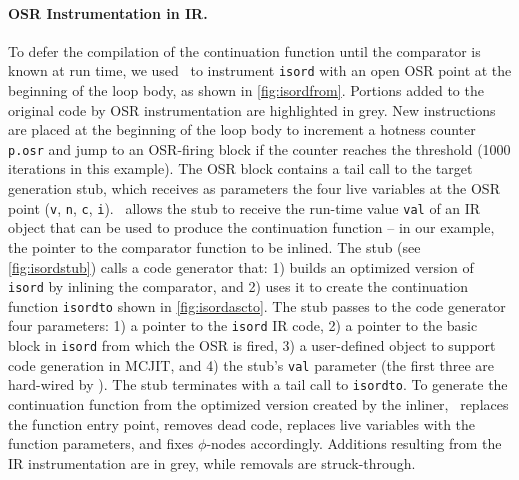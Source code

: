 \paragraph{OSR Instrumentation in IR.}
To defer the compilation of the continuation function until the comparator is known at run time, we used \osrkit\ to instrument {\tt isord} with an open OSR point at the beginning of the loop body, as shown in \myfigure\ref{fig:isordfrom}. Portions added to the original code by OSR instrumentation are highlighted in grey.
New instructions are placed at the beginning of the loop body to increment a hotness counter {\tt p.osr} and jump to an OSR-firing block if the counter reaches the threshold (1000 iterations in this example). The OSR block contains a tail call to the target generation stub, which receives as parameters the four live variables at the OSR point ({\tt v}, {\tt n}, {\tt c}, {\tt i}). \osrkit\ allows the stub to receive the run-time value {\tt val} of an IR object that can be used to produce the continuation function -- in our example, the pointer to the comparator function to be inlined. The stub (see \myfigure\ref{fig:isordstub}) calls a code generator that: 1) builds an optimized version of {\tt isord} by inlining the comparator, and 2) uses it to create the continuation function {\tt isordto} shown in \myfigure\ref{fig:isordascto}. The stub passes to the code generator four parameters: 1) a pointer to the {\tt isord} IR code, 2) a pointer to the basic block in {\tt isord} from which the OSR is fired, 3) a user-defined object to support code generation in MCJIT, and 4) the stub's {\tt val} parameter (the first three are hard-wired by \osrkit). The stub terminates with a tail call to {\tt isordto}. To generate the continuation function from the optimized version created by the inliner, \osrkit\ replaces the function entry point, removes dead code, replaces live variables with the function parameters, and fixes $\phi$-nodes accordingly. Additions resulting from the IR instrumentation are in grey, while removals are struck-through.

